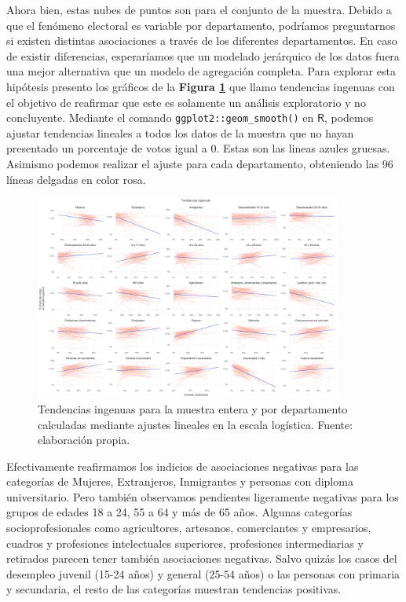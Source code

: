 Ahora bien, estas nubes de puntos son para el conjunto de la muestra. Debido a que el fenómeno electoral es variable por departamento, podríamos preguntarnos si existen distintas asociaciones a través de los diferentes departamentos. En caso de existir diferencias, esperaríamos que un modelado jerárquico de los datos fuera una mejor alternativa que un modelo de agregación completa. Para explorar esta hipótesis presento los gráficos de la \textbf{Figura \ref{fig:Tendencias_Ingenuas_Muestra}} que llamo tendencias ingenuas con el objetivo de reafirmar que este es solamente un análisis exploratorio y no concluyente. Mediante el comando \verb|ggplot2::geom_smooth()| en $\mathsf{R}$, podemos ajustar tendencias lineales a todos los datos de la muestra que no hayan presentado un porcentaje de votos igual a 0. Estas son las lineas azules gruesas. Asimismo podemos realizar el ajuste para cada departamento, obteniendo las 96 líneas delgadas en color rosa.\\ 

\begin{figure}
	\centering
	\includegraphics[width = 0.9\textwidth]{Figs/AED/Tend_Ingenuas_Todas_MUESTRA}
	\caption{Tendencias ingenuas para la muestra entera y por departamento calculadas mediante ajustes lineales en la escala logística. Fuente: elaboración propia.}
	\label{fig:Tendencias_Ingenuas_Muestra}	
\end{figure}

Efectivamente reafirmamos los indicios de asociaciones negativas para las categorías de Mujeres, Extranjeros, Inmigrantes y personas con diploma universitario. Pero también observamos pendientes ligeramente negativas para los grupos de edades 18 a 24, 55 a 64 y más de 65 años. Algunas categorías socioprofesionales como agricultores, artesanos, comerciantes y empresarios, cuadros y profesiones intelectuales superiores, profesiones intermediarias y retirados parecen tener también asociaciones negativas. Salvo quizás los casos del desempleo juvenil (15-24 años) y general (25-54 años) o las personas con primaria y secundaria, el resto de las categorías muestran tendencias positivas.\\

